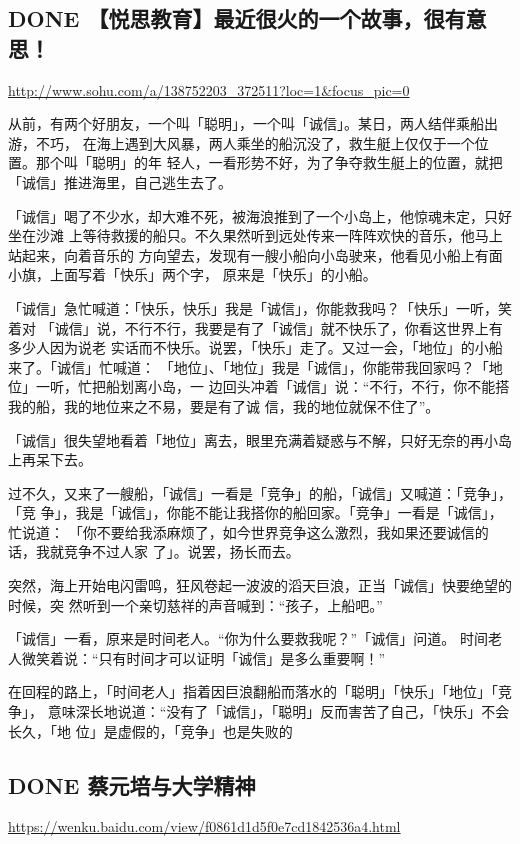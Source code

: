 \documentclass[11pt]{ctexart}
\begin{document}
{{{{\subsection{{\bfseries\sffamily DONE} 【悦思教育】最近很火的一个故事，很有意思！}
\label{sec:org75d8059}
\url{http://www.sohu.com/a/138752203\_372511?loc=1\&focus\_pic=0}

从前，有两个好朋友，一个叫「聪明」，一个叫「诚信」。某日，两人结伴乘船出游，不巧，
在海上遇到大风暴，两人乘坐的船沉没了，救生艇上仅仅于一个位置。那个叫「聪明」的年
轻人，一看形势不好，为了争夺救生艇上的位置，就把「诚信」推进海里，自己逃生去了。

「诚信」喝了不少水，却大难不死，被海浪推到了一个小岛上，他惊魂未定，只好坐在沙滩
上等待救援的船只。不久果然听到远处传来一阵阵欢快的音乐，他马上站起来，向着音乐的
方向望去，发现有一艘小船向小岛驶来，他看见小船上有面小旗，上面写着「快乐」两个字，
原来是「快乐」的小船。

「诚信」急忙喊道：「快乐，快乐」我是「诚信」，你能救我吗？「快乐」一听，笑着对
「诚信」说，不行不行，我要是有了「诚信」就不快乐了，你看这世界上有多少人因为说老
实话而不快乐。说罢，「快乐」走了。又过一会，「地位」的小船来了。「诚信」忙喊道：
「地位」、「地位」我是「诚信」，你能带我回家吗？「地位」一听，忙把船划离小岛，一
边回头冲着「诚信」说：“不行，不行，你不能搭我的船，我的地位来之不易，要是有了诚
信，我的地位就保不住了”。


「诚信」很失望地看着「地位」离去，眼里充满着疑惑与不解，只好无奈的再小岛上再呆下去。

过不久，又来了一艘船，「诚信」一看是「竞争」的船，「诚信」又喊道：「竞争」，「竞
争」，我是「诚信」，你能不能让我搭你的船回家。「竞争」一看是「诚信」，忙说道：
「你不要给我添麻烦了，如今世界竞争这么激烈，我如果还要诚信的话，我就竞争不过人家
了」。说罢，扬长而去。

突然，海上开始电闪雷鸣，狂风卷起一波波的滔天巨浪，正当「诚信」快要绝望的时候，突
然听到一个亲切慈祥的声音喊到：“孩子，上船吧。”

「诚信」一看，原来是时间老人。“你为什么要救我呢？”「诚信」问道。
时间老人微笑着说：“只有时间才可以证明「诚信」是多么重要啊！”

在回程的路上，「时间老人」指着因巨浪翻船而落水的「聪明」「快乐」「地位」「竞争」，
意味深长地说道：“没有了「诚信」，「聪明」反而害苦了自己，「快乐」不会长久，「地
位」是虚假的，「竞争」也是失败的

\subsection{{\bfseries\sffamily DONE} 蔡元培与大学精神}
\label{sec:orgb5a43f8}
\url{https://wenku.baidu.com/view/f0861d1d5f0e7cd1842536a4.html}

}}}}
\end{document}

